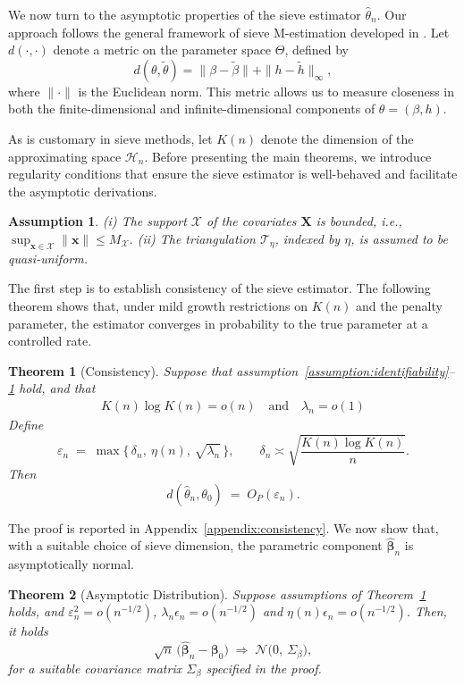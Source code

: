 \documentclass[11pt]{article}
\newtheorem{assumption}{Assumption}
\newtheorem{theorem}{Theorem}
\begin{document}
We now turn to the asymptotic properties of the sieve estimator $\hat\theta_n$. 
Our approach follows the general framework of sieve M-estimation developed in \cite{chen2007large}. Let $d(\cdot, \cdot)$ denote a metric on the parameter space $\Theta$, defined by
\[
d(\theta,\tilde \theta) = \|\beta-\tilde \beta\| + \|h-\tilde h\|_{\infty},
\]
where $\|\cdot\|$ is the Euclidean norm.  
This metric allows us to measure closeness in both the finite-dimensional and infinite-dimensional components of $\theta = (\beta,h)$.

As is customary in sieve methods, let $K(n)$ denote the dimension of the approximating space $\mathcal{H}_n$. Before presenting the main theorems, we introduce regularity conditions that ensure the sieve estimator is well-behaved and facilitate the asymptotic derivations.

\begin{assumption}\label{assumption:density_P}
	(i) The support $\mathcal{X}$ of the covariates $\bm X$ is bounded, i.e.,
	\(
	\sup_{\bm x\in \mathcal{X}} \|\bm x\|\le M_{\mathcal{X}}.
	\) (ii) The triangulation $\mathcal{T}_\eta$, indexed by $\eta$, is assumed to be quasi-uniform.
\end{assumption}

The first step is to establish consistency of the sieve estimator. The following theorem shows that, under mild growth restrictions on $K(n)$ and the penalty parameter, the estimator converges in probability to the true parameter at a controlled rate.

\begin{theorem}[Consistency]\label{theo:consistency}
	Suppose that  assumption~\ref{assumption:identifiability}--\ref{assumption:density_P} hold,  and that
	\begin{align}\label{eq:growth_rule}
		K(n)\log K(n)=o(n)\quad \text{and}\quad  \lambda_n=o(1)
	\end{align} 
	Define
	\[
	\varepsilon_n \;=\; \max\Big\{\,\delta_n,\ \eta(n),\, \sqrt{\lambda_n}\,\Big\},
	\qquad
	\delta_n \asymp \sqrt{\frac{K(n)\log K(n)}{n}}.
	\]
	Then
	\[
	d(\hat\theta_n,\theta_0) \;=\; O_P(\varepsilon_n).
	\]
\end{theorem}
The proof is reported in Appendix~\ref{appendix:consistency}.  We now show that, with a suitable choice of sieve dimension, the parametric component $\hat{\bm\beta}_n$ is asymptotically normal. 

\begin{theorem}[Asymptotic Distribution]\label{thm:beta-CLT-rewrite}
Suppose assumptions of Theorem~\ref{theo:consistency} holds, and $\varepsilon_n^2 = o(n^{-1/2})$,  $\lambda_n \epsilon_n = o(n^{-1/2})$ and $\eta(n)\epsilon_n  = o(n^{-1/2})$. Then, it holds
	\[
	\sqrt{n}\,\big(\hat{\bm\beta}_n - \bm\beta_0\big)
	\;\Rightarrow\; \mathcal N\!\big(0,\ \Sigma_\beta\big),
	\]
	for a suitable covariance matrix $\Sigma_\beta$ specified in the proof.
\end{theorem}
\end{document}
